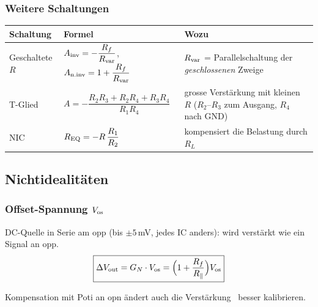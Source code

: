 \subsubsection*{Weitere Schaltungen}
\vspace{2pt}
{\renewcommand{\arraystretch}{1.6}
\begin{tabularx}{\columnwidth}{@{}l l X@{}}
	\toprule
	\textbf{Schaltung} & \textbf{Formel} & \textbf{Wozu} \\ \midrule
	Geschaltete $R$ & $A_{\rm inv} = -\dfrac{R_f}{R_{\rm var}}$, \; $A_{\rm n.inv} = 1+\dfrac{R_f}{R_{\rm var}}$
	                & $R_{\rm var}$ = Parallelschaltung der \emph{geschlossenen} Zweige \\
	T-Glied         & $A = -\dfrac{R_2R_3+R_2R_4+R_3R_4}{R_1R_4}$
	                & grosse Verstärkung mit kleinen $R$ ($R_2$--$R_3$ zum Ausgang, $R_4$ nach GND) \\
	NIC             & $R_{\rm EQ} = -R\,\dfrac{R_1}{R_2}$
	                & kompensiert die Belastung durch $R_L$ \\ \bottomrule
\end{tabularx}}

\subsection{Nichtidealitäten}\label{sec:opamp-nonideal}

\subsubsection*{Offset-Spannung $V_{\rm os}$}
DC-Quelle in Serie am opp (bis $\pm5\,$mV, jedes IC anders): wird verstärkt wie ein Signal an opp.
$$ \boxed{ \Delta V_{\rm out} = G_N \cdot V_{\rm os} = \Big(1+\frac{R_f}{R_\parallel}\Big) V_{\rm os} } $$
\begin{warnbox}
	\small
\end{warnbox}
Kompensation mit Poti an opn ändert auch die Verstärkung \textrightarrow\ besser kalibrieren.

